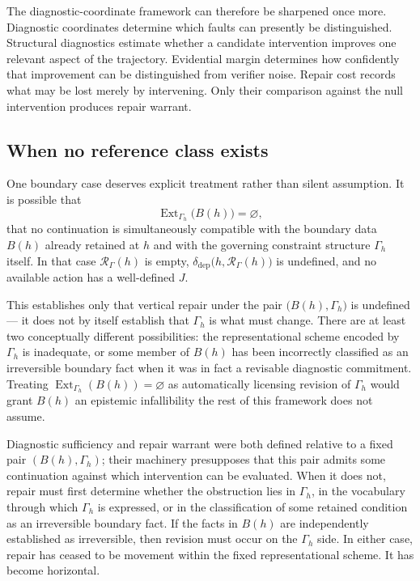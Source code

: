 \documentclass[11pt]{article}
\begin{document}
The diagnostic-coordinate framework can therefore be sharpened once
more. Diagnostic coordinates determine which faults can presently be
distinguished. Structural diagnostics estimate whether a candidate
intervention improves one relevant aspect of the trajectory. Evidential
margin determines how confidently that improvement can be distinguished
from verifier noise. Repair cost records what may be lost merely by
intervening. Only their comparison against the null intervention
produces repair warrant.

\subsection{When no reference class exists}

One boundary case deserves explicit treatment rather than silent
assumption. It is possible that
\[
	\operatorname{Ext}_{\Gamma_h}\bigl(B(h)\bigr) = \varnothing,
\]
that no continuation is simultaneously compatible with the boundary data
$B(h)$ already retained at $h$ and with the governing constraint
structure $\Gamma_h$ itself. In that case $\mathcal{R}_\Gamma(h)$ is
empty, $\delta_{\mathrm{dep}}\bigl(h, \mathcal{R}_\Gamma(h)\bigr)$ is
undefined, and no available action has a well-defined $J$.

This establishes only that vertical repair under the pair
$\bigl(B(h), \Gamma_h\bigr)$ is undefined --- it does not by itself
establish that $\Gamma_h$ is what must change. There are at least two
conceptually different possibilities: the representational scheme
encoded by $\Gamma_h$ is inadequate, or some member of $B(h)$ has been
incorrectly classified as an irreversible boundary fact when it was in
fact a revisable diagnostic commitment. Treating $\operatorname{Ext}_{\Gamma_h}(B(h)) = \varnothing$
as automatically licensing revision of $\Gamma_h$ would grant $B(h)$ an
epistemic infallibility the rest of this framework does not assume.

Diagnostic sufficiency and repair warrant were both defined relative to
a fixed pair $(B(h), \Gamma_h)$; their machinery presupposes that this
pair admits some continuation against which intervention can be
evaluated. When it does not, repair must first determine whether the
obstruction lies in $\Gamma_h$, in the vocabulary through which
$\Gamma_h$ is expressed, or in the classification of some retained
condition as an irreversible boundary fact. If the facts in $B(h)$ are
independently established as irreversible, then revision must occur on
the $\Gamma_h$ side. In either case, repair has ceased to be movement
within the fixed representational scheme. It has become horizontal.
\end{document}
